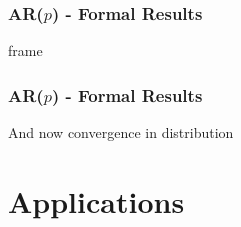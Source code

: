 \documentclass[9pt]{beamer}
\newcommand{\weight}{\pi}
\newtheorem{prop}{Proposition}
\theoremstyle{definition}
\begin{document}


\begin{frame}\frametitle{AR($p$) - Formal Results} 

    frame


\end{frame}

\begin{frame}\frametitle{AR($p$) - Formal Results} 

    And now convergence in distribution


\end{frame}

\section{Applications}
\end{document}
